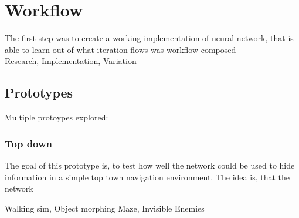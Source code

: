 \chapter{Workflow}
The first step was to create a working implementation of neural network, that is able to learn
out of what iteration flows was workflow composed \\
Research, Implementation, Variation

\section{Prototypes}
Multiple protoypes explored:

\subsection{Top down}
The goal of this prototype is, to test how well the network could be used to hide information in a simple top town navigation environment.
The idea is, that the network

Walking sim,
Object morphing
Maze,
Invisible Enemies